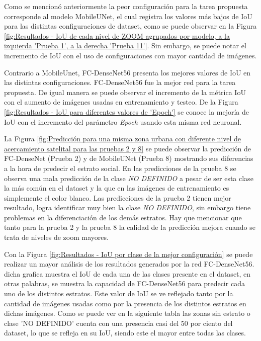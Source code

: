 
Como se mencionó anteriormente la peor configuración para la tarea propuesta corresponde al modelo MobileUNet, el cual registra los valores más bajos de IoU para las distintas configuraciones de dataset, como se puede observar en la Figura  \ref{fig:Resultados - IoU de cada nivel de ZOOM agrupados por modelo, a la izquierda 'Prueba 1', a la derecha 'Prueba 11'}. Sin embargo, se puede notar el incremento de IoU con el uso de configuraciones con mayor cantidad de imágenes. 


Contrario a MobileUnet, FC-DenseNet56 presenta los mejores valores de IoU en las distintas configuraciones. FC-DenseNet56 fue la mejor red para la tarea propuesta. De igual manera se puede observar el incremento de la métrica IoU con el aumento de imágenes usadas en entrenamiento y testeo. De la Figura \ref{fig:Resultados - IoU para diferentes valores de 'Epoch'} se conoce la mejoría de IoU con el incremento del parámetro \textit{Epoch} usando esta misma red neuronal. 


La Figura \ref{fig:Predicción para una misma zona urbana con diferente nivel de acercamiento satelital para las pruebas 2 y 8} se puede observar la predicción de FC-DenseNet (Prueba 2) y de MobileUNet (Prueba 8) mostrando sus diferencias a la hora de predecir el estrato social. En las predicciones de la prueba 8 se observa una mala predicción de la clase \textit{NO DEFINIDO} a pesar de ser esta clase la más común en el dataset y la que en las imágenes de entrenamiento es simplemente el color blanco. Las predicciones de la prueba 2 tienen mejor resultado, logra identificar muy bien la clase \textit{NO DEFINIDO}, sin embargo tiene problemas en la diferenciación de los demás estratos. Hay que mencionar que tanto para la prueba 2 y la prueba 8 la calidad de la predicción mejora cuando se trata de niveles de zoom mayores. 



Con la Figura \ref{fig:Resultados - IoU por clase de la mejor configuración} se puede realizar un mayor análisis de los resultados generados por la red FC-DenseNet56. dicha grafica muestra el IoU de cada una de las clases presente en el dataset, en otras palabras, se muestra la capacidad de FC-DenseNet56 para predecir cada uno de los distintos estratos. Este valor de IoU se ve reflejado tanto por la cantidad de imágenes usadas como por la presencia de los distintos estratos en dichas imágenes. Como se puede ver en la siguiente tabla las zonas sin estrato o clase 'NO DEFINIDO' cuenta con una presencia casi del 50 por ciento del dataset, lo que se refleja en su IoU, siendo este el mayor entre todas las clases. 


